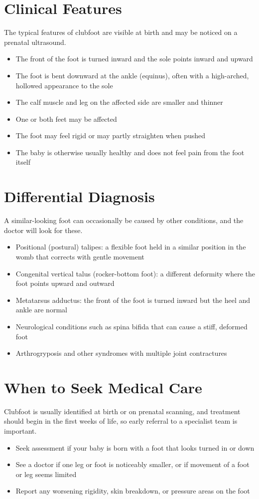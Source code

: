 \section*{Clinical Features}
The typical features of clubfoot are visible at birth and may be noticed on a prenatal ultrasound.
\begin{itemize}
    \item The front of the foot is turned inward and the sole points inward and upward
    \item The foot is bent downward at the ankle (equinus), often with a high-arched, hollowed appearance to the sole
    \item The calf muscle and leg on the affected side are smaller and thinner
    \item One or both feet may be affected
    \item The foot may feel rigid or may partly straighten when pushed
    \item The baby is otherwise usually healthy and does not feel pain from the foot itself
\end{itemize}

\section*{Differential Diagnosis}
A similar-looking foot can occasionally be caused by other conditions, and the doctor will look for these.
\begin{itemize}
    \item Positional (postural) talipes: a flexible foot held in a similar position in the womb that corrects with gentle movement
    \item Congenital vertical talus (rocker-bottom foot): a different deformity where the foot points upward and outward
    \item Metatarsus adductus: the front of the foot is turned inward but the heel and ankle are normal
    \item Neurological conditions such as spina bifida that can cause a stiff, deformed foot
    \item Arthrogryposis and other syndromes with multiple joint contractures
\end{itemize}

\section*{When to Seek Medical Care}
Clubfoot is usually identified at birth or on prenatal scanning, and treatment should begin in the first weeks of life, so early referral to a specialist team is important.
\begin{itemize}
    \item Seek assessment if your baby is born with a foot that looks turned in or down
    \item See a doctor if one leg or foot is noticeably smaller, or if movement of a foot or leg seems limited
    \item Report any worsening rigidity, skin breakdown, or pressure areas on the foot
\end{itemize}

